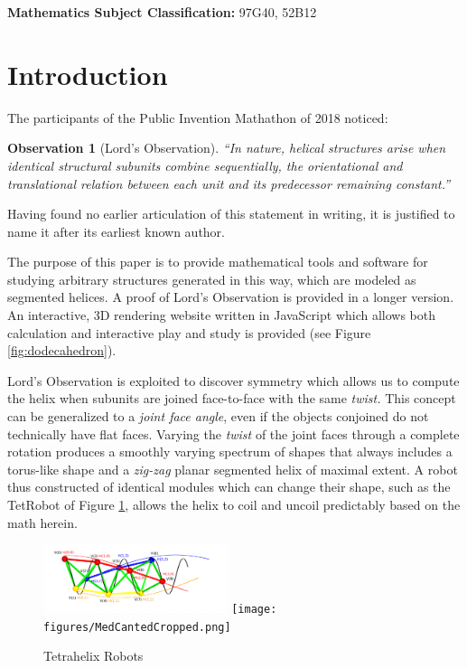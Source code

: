 \documentclass{svproc}
\newtheorem{observation}{Observation}
\begin{document}
\makeatletter
\newcommand{\subjclass}[1]{%
    \small
    \textbf{Mathematics Subject Classification:} #1}


\makeatother

\subjclass{ 97G40, 52B12}

\section{Introduction}

The participants of the Public Invention Mathathon of 2018\cite{read2019mathathon} noticed:
\begin{observation}[Lord's Observation]
  “In nature, helical structures arise when identical structural subunits combine sequentially, the orientational and translational relation between each unit and its predecessor remaining constant.”\cite{lord2002helical}
  \label{obs:lords}
\end{observation}
Having found no earlier articulation of this statement
in writing, it is justified to name it after its earliest known author.

The purpose of this paper is to provide mathematical
tools and software for studying arbitrary
structures generated in this way, which are modeled as segmented helices.
A proof of Lord's Observation is provided in a longer version\cite{readfullsegmentedhelix}.
An interactive, 3D rendering website written in JavaScript which allows both calculation and
interactive play and study is provided\cite{segmentedhelixinteractive}
(see Figure \ref{fig:dodecahedron}).

Lord's Observation is exploited to discover symmetry which allows us to compute the helix when subunits are joined face-to-face with
the same {\em twist.}
This concept can be generalized to a {\em joint face angle}, even if the
objects conjoined do not technically have flat faces.
Varying the {\em twist} of the joint faces through a complete rotation produces a smoothly varying
spectrum of shapes that always includes a torus-like shape and a
{\em zig-zag} planar segmented helix of maximal extent.
A robot thus constructed of identical modules which can change their shape, such as the TetRobot of Figure \ref{fig:tetrahelices}, allows the helix to coil and uncoil
predictably based on the math herein.

\begin{figure}
  \centering

{\includegraphics[width=0.48\textwidth]{figures/UnifiedDrawing.png}}
{\texttt{[image: figures/MedCantedCropped.png]}}
\caption{Tetrahelix Robots}\label{fig:tetrahelices}
\end{figure}
\end{document}
